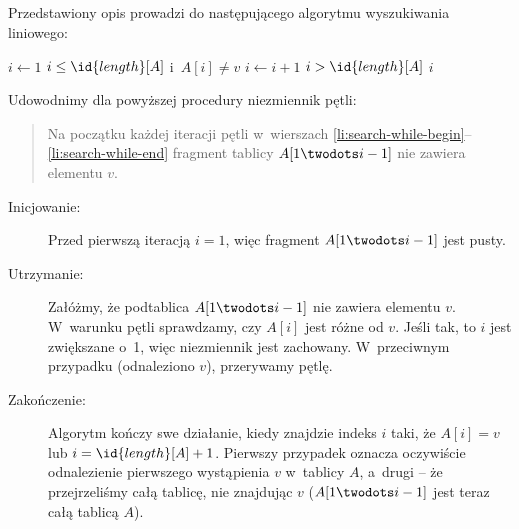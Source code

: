 \subsection{} %
Przedstawiony opis prowadzi do następującego algorytmu wyszukiwania liniowego:
\begin{codebox}
\li	$i\gets 1$
\li	\While $i\le\id{length}[A]$ i~$A[i]\ne v$ \label{li:search-while-begin}
\li		\Do
			$i\gets i+1$
		\End \label{li:search-while-end}
\li	\If $i>\id{length}[A]$
\li		\Then \label{li:ins-sort-while-cond}
			\Return {}
\li		\Else
			\Return $i$
		\End
\end{codebox}
Udowodnimy dla powyższej procedury niezmiennik pętli:
\begin{quote}
Na początku każdej iteracji pętli  w~wierszach \ref{li:search-while-begin}--\ref{li:search-while-end} fragment tablicy $A[1\twodots i-1]$ nie zawiera elementu $v$.
\end{quote}
\begin{description}
	\item[Inicjowanie:] Przed pierwszą iteracją $i=1$, więc fragment $A[1\twodots i-1]$ jest pusty.
	\item[Utrzymanie:] Załóżmy, że podtablica $A[1\twodots i-1]$ nie zawiera elementu $v$. W~warunku pętli  sprawdzamy, czy $A[i]$ jest różne od $v$. Jeśli tak, to $i$ jest zwiększane o~1, więc niezmiennik jest zachowany. W~przeciwnym przypadku (odnaleziono $v$), przerywamy pętlę.
	\item[Zakończenie:] Algorytm kończy swe działanie, kiedy znajdzie indeks $i$ taki, że $A[i]=v$ lub $i=\id{length}[A]+1$. Pierwszy przypadek oznacza oczywiście odnalezienie pierwszego wystąpienia $v$ w~tablicy $A$, a~drugi -- że przejrzeliśmy całą tablicę, nie znajdując $v$ ($A[1\twodots i-1]$ jest teraz całą tablicą $A$).
\end{description}

